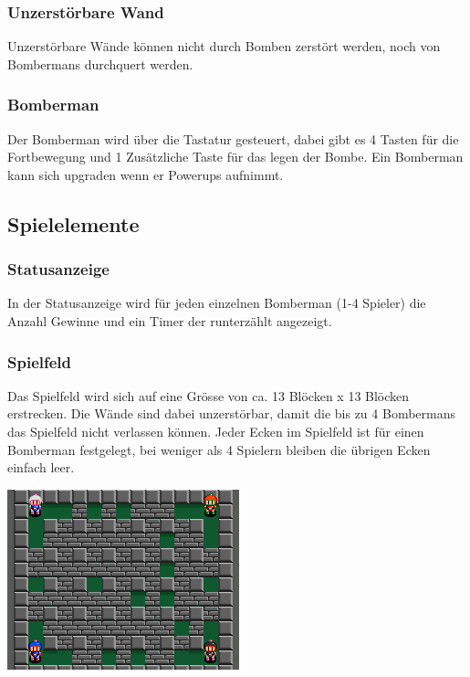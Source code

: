 \documentclass[11pt]{scrartcl}
\begin{document}
\subsubsection{Unzerstörbare Wand}
\label{sec:Unzerstörbare Wand}
Unzerstörbare Wände können nicht durch Bomben zerstört werden, noch von Bombermans durchquert werden.

\subsubsection{Bomberman}
\label{sec:Bomberman}
Der Bomberman wird über die Tastatur gesteuert, dabei gibt es 4 Tasten für die Fortbewegung und 1 Zusätzliche Taste für das legen der Bombe.
Ein Bomberman kann sich \grqq{}upgraden\grqq{} wenn er Powerups aufnimmt.

\subsection{Spielelemente}
\label{sec:Spielelemente}
\subsubsection{Statusanzeige}
\label{sec:Statusanzeige}
In der Statusanzeige wird für jeden einzelnen Bomberman (1-4 Spieler) die Anzahl 
Gewinne und ein Timer der runterzählt angezeigt.
\subsubsection{Spielfeld}
\label{sec:Spielfeld}
Das Spielfeld wird sich auf eine Grösse von ca. 13 Blöcken x 13 Blöcken 
erstrecken.
Die Wände sind dabei unzerstörbar, damit die bis zu 4 Bombermans das Spielfeld 
nicht verlassen können.
Jeder Ecken im Spielfeld ist für einen Bomberman festgelegt, bei weniger als 4 
Spielern bleiben die übrigen Ecken einfach leer.

\includegraphics[scale=1.5]{bombermanmap} 

\cite{Bomberman Spielfeld}
\newpage
\end{document}
